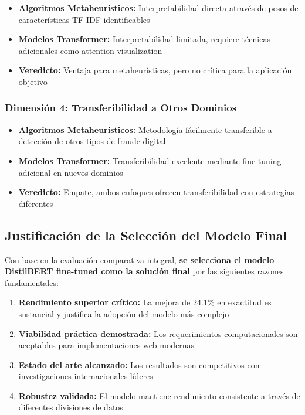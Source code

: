 \begin{itemize}
    \item \textbf{Algoritmos Metaheurísticos:} Interpretabilidad directa através de pesos de características TF-IDF identificables
    \item \textbf{Modelos Transformer:} Interpretabilidad limitada, requiere técnicas adicionales como attention visualization
    \item \textbf{Veredicto:} Ventaja para metaheurísticas, pero no crítica para la aplicación objetivo
\end{itemize}

\subsubsection{Dimensión 4: Transferibilidad a Otros Dominios}

\begin{itemize}
    \item \textbf{Algoritmos Metaheurísticos:} Metodología fácilmente transferible a detección de otros tipos de fraude digital
    \item \textbf{Modelos Transformer:} Transferibilidad excelente mediante fine-tuning adicional en nuevos dominios
    \item \textbf{Veredicto:} Empate, ambos enfoques ofrecen transferibilidad con estrategias diferentes
\end{itemize}

\subsection{Justificación de la Selección del Modelo Final}

Con base en la evaluación comparativa integral, \textbf{se selecciona el modelo DistilBERT fine-tuned como la solución final} por las siguientes razones fundamentales:

\begin{enumerate}
    \item \textbf{Rendimiento superior crítico:} La mejora de 24.1\% en exactitud es sustancial y justifica la adopción del modelo más complejo
    \item \textbf{Viabilidad práctica demostrada:} Los requerimientos computacionales son aceptables para implementaciones web modernas
    \item \textbf{Estado del arte alcanzado:} Los resultados son competitivos con investigaciones internacionales líderes
    \item \textbf{Robustez validada:} El modelo mantiene rendimiento consistente a través de diferentes divisiones de datos
\end{enumerate}

